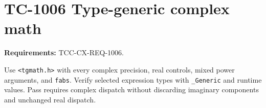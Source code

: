 \documentclass{article}
\begin{document}
\section*{TC-1006 Type-generic complex math}
\textbf{Requirements:} TCC-CX-REQ-1006.

Use \texttt{<tgmath.h>} with every complex precision, real controls, mixed
power arguments, and \texttt{fabs}. Verify selected expression types with
\texttt{\_Generic} and runtime values. Pass requires complex dispatch without
discarding imaginary components and unchanged real dispatch.
\end{document}
